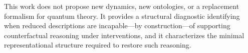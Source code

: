 This work does not propose new dynamics, new ontologies, or a replacement formalism for quantum theory. It provides a structural diagnostic identifying when reduced descriptions are incapable—by construction—of supporting counterfactual reasoning under interventions, and it characterizes the minimal representational structure required to restore such reasoning.